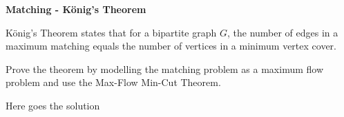 \question \textbf{Matching - König's Theorem}

König's Theorem states that for a bipartite graph $G$, the number of edges in a maximum matching equals the number of vertices in a minimum vertex cover. 

Prove the theorem by modelling the matching problem as a maximum flow problem and use the Max-Flow Min-Cut Theorem.  

\begin{solution}
Here goes the solution
\end{solution}
